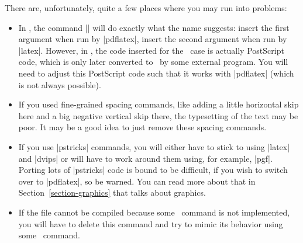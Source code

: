 There are, unfortunately, quite a few places where you may run into problems:
\begin{itemize}
\item
  In \beamer, the command |\PDForPS| will do exactly what the name suggests: insert the first argument when run by |pdflatex|, insert the second argument when run by |latex|. However, in \prosper, the code inserted for the \pdf\ case is actually PostScript code, which is only later converted to \pdf\ by some external program. You will need to adjust this PostScript code such that it works with |pdflatex| (which is not always possible).
\item
  If you used fine-grained spacing commands, like adding a little horizontal skip   here and a big negative vertical skip there, the typesetting of the text may be poor. It may be a good idea to just remove these spacing commands.
\item
  If you use |pstricks| commands, you will either have to stick to using |latex| and |dvips| or will have to work around them using, for example, |pgf|. Porting lots of |pstricks| code is bound to be difficult, if you wish to switch over to |pdflatex|, so be warned. You can read more about that in Section~\ref{section-graphics} that talks about graphics.
\item
  If the file cannot be compiled because some \prosper\ command is not implemented, you will have to delete this command and try to mimic its behavior using some \beamer\ command.
\end{itemize}

